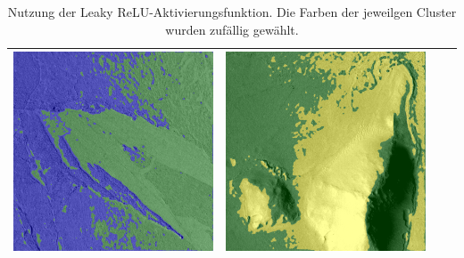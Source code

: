 \begin{table}[h!]
\begin{tabularx}{\textwidth}{>{\centering}m{}
			>{\centering}m{}
			>{\centering}m{}
			>{\centering\arraybackslash}m{}}
		\includegraphics[width=0.9\linewidth]{images/gen/activation_functions/p03_03.png_leakyrelu.png} &
		\includegraphics[width=0.9\linewidth]{images/gen/activation_functions/p03_04.png_leakyrelu.png} \\
		\bottomrule
	\end{tabularx}
	\caption{Nutzung der Leaky ReLU-Aktivierungsfunktion. Die Farben der jeweilgen Cluster wurden zufällig gewählt.\\}
	\label{tab:leaky_relu_application}
\end{table}

